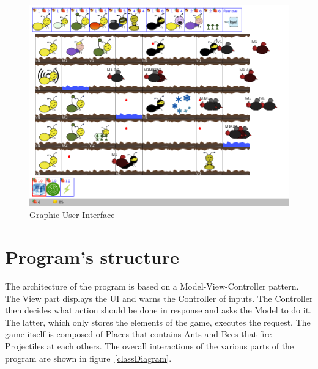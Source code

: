 \documentclass[
	a4paper
]{article}
\begin{document}
%
\begin{figure}[H]
	\includegraphics[scale=0.3]{screen2.png}
	\caption{Graphic User Interface}
	\label{gui}
\end{figure}
%


\section{Program's structure} %

The architecture of the program is based on a Model-View-Controller pattern. %
The View part displays the UI and warns the Controller of inputs. The Controller then decides what action should be done in response and asks the Model to do it. %
The latter, which only stores the elements of the game, executes the request. %
The game itself is composed of Places that contains Ants and Bees that fire Projectiles at each others. %
The overall interactions of the various parts of the program are shown in figure~\ref{classDiagram}.
\end{document}
